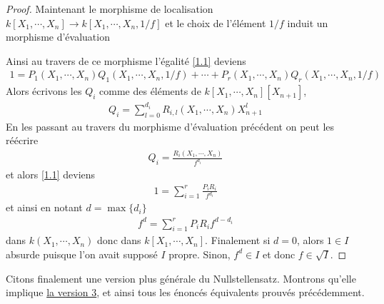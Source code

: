 \begin{proof}
                Maintenant le morphisme de localisation $k[X_1, \cdots, X_n] \to k[X_1, \cdots, X_n, 1/f]$ et le choix de l'élément $1/f$ induit un morphisme d'évaluation
                \begin{figure}[H]
                    \centering
                \end{figure}
                Ainsi au travers de ce morphisme l'égalité \ref{1.1} deviens
                \begin{align*}
                    1 = P_1(X_1, \cdots, X_n)Q_1(X_1, \cdots, X_n, 1/f) + \cdots + P_r(X_1, \cdots, X_n)Q_r(X_1, \cdots, X_n, 1/f)
                \end{align*}
                Alors écrivons les $Q_i$ comme des éléments de $k[X_1, \cdots, X_n][X_{n+1}]$,
                \begin{align*}
                    Q_i = \sum_{l = 0}^{d_i} R_{i,l}(X_1, \cdots, X_n)X^l_{n+1}
                \end{align*}
                En les passant au travers du morphisme d'évaluation précédent on peut les réécrire
                \begin{align*}
                    Q_i = \frac{R_i(X_1, \cdots, X_n)}{f^{d_i}}
                \end{align*}
                et alors \ref{1.1} deviens
                \begin{align*}
                    1 = \sum_{i = 1}^r \frac{P_iR_i}{f^{d_i}}
                \end{align*}
                et ainsi en notant $d = \max \{d_i\}$
                \begin{align*}
                    f^d = \sum_{i = 1}^r P_iR_if^{d - d_i}
                \end{align*} 
                dans $k(X_1, \cdots, X_n)$ donc dans $k[X_1, \cdots, X_n]$. Finalement si $d = 0$, alors $1 \in I$ absurde puisque l'on avait supposé $I$ propre. Sinon, $f^d \in I$ et donc $f \in \sqrt{I}$.
            \end{proof}
            Citons finalement une version plus générale du Nullstellensatz. Montrons qu'elle implique \hyperref[null_1]{la version 3}, et ainsi tous les énoncés équivalents prouvés précédemment.
